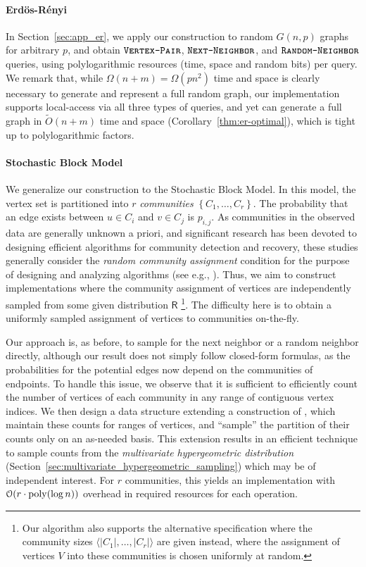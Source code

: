 \paragraph*{Erd\"{o}s-R\'{e}nyi}
\label{par:erdos_renyi}
In Section~\ref{sec:app_er}, we apply our construction to random $G(n,p)$ graphs for arbitrary $p$, and obtain $\texttt{\textsc{Vertex-Pair}}$,
$\texttt{\textsc{Next-Neighbor}}$, and $\texttt{\textsc{Random-Neighbor}}$ queries, using polylogarithmic resources (time, space and random bits) per query.
We remark that, while $\Omega(n+m) = \Omega(p n^2)$ time and space is clearly necessary to generate and represent a full random graph,
our implementation supports local-access via all three types of queries, and yet can generate a full graph in $\widetilde{O}(n+m)$ time and space
(Corollary~\ref{thm:er-optimal}), which is tight up to polylogarithmic factors.


\paragraph*{Stochastic Block Model}
\label{par:stochastic_block_model}
We generalize our construction to the Stochastic Block Model.
In this model, the vertex set is partitioned into $r$ \emph{communities} $\left\{ C_1, \ldots, C_r \right\}$.
The probability that an edge exists between $u\in C_i$ and $v \in C_j$ is $p_{i,j}$.
As communities in the observed data are generally unknown a priori,
and significant research has been devoted to designing efficient algorithms for community detection and recovery, these studies generally consider
the \emph{random community assignment} condition for the purpose of designing and analyzing algorithms (see e.g., \cite{mossel2015reconstruction}).
Thus, we aim to construct implementations where the community assignment of vertices are independently sampled from some given distribution $\mathsf{R}$
\footnote{Our algorithm also supports the alternative specification where the community sizes $\langle |C_1|, \ldots, |C_r|\rangle$
are given instead, where the assignment of vertices $V$ into these communities is chosen uniformly at random.}.
The difficulty here is to obtain a uniformly sampled assignment of vertices to communities on-the-fly.

Our approach is, as before, to sample for the next neighbor or a random neighbor directly,
although our result does not simply follow closed-form formulas,
as the probabilities for the potential edges now depend on the communities of endpoints.
To handle this issue, we observe that it is sufficient to efficiently count
the number of vertices of each community in any range of contiguous vertex indices.
We then design a data structure extending a construction of \cite{huge}, which maintain these counts for ranges of vertices,
and ``sample'' the partition of their counts only on an as-needed basis.
This extension results in an efficient technique to sample counts from the \emph{multivariate hypergeometric distribution}
(Section~\ref{sec:multivariate_hypergeometric_sampling}) which may be of independent interest.
For $r$ communities, this yields an implementation with $ \mathcal{O}(r\cdot \mathrm{poly}(\log n))$ overhead in required resources for each operation.




